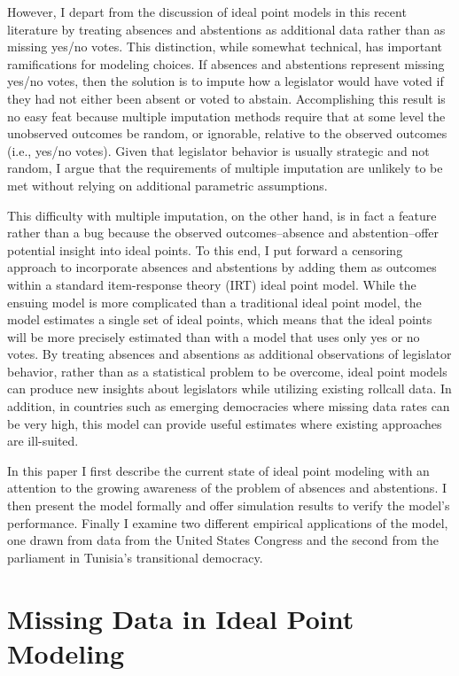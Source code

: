 	However, I depart from the discussion of ideal point models in this recent literature by treating absences and abstentions as additional data rather than as missing yes/no votes. This distinction, while somewhat technical, has important ramifications for modeling choices. If absences and abstentions represent missing yes/no votes, then the solution is to impute how a legislator would have voted if they had not either been absent or voted to abstain. Accomplishing this result is no easy feat because multiple imputation methods require that at some level the unobserved outcomes be random, or ignorable, relative to the observed outcomes (i.e., yes/no votes). Given that legislator behavior is usually strategic and not random, I argue that the requirements of multiple imputation are unlikely to be met without relying on additional parametric assumptions. 
	
	This difficulty with multiple imputation, on the other hand, is in fact a feature rather than a bug because the observed outcomes--absence and abstention--offer potential insight into ideal points. To this end, I put forward a censoring approach to incorporate absences and abstentions by adding them as outcomes within a standard item-response theory (IRT) ideal point model. While the ensuing model is more complicated than a traditional ideal point model, the model estimates a single set of ideal points, which means that the ideal points will be more precisely estimated than with a model that uses only yes or no votes. By treating absences and absentions as additional observations of legislator behavior, rather than as a statistical problem to be overcome, ideal point models can produce new insights about legislators while utilizing existing rollcall data. In addition, in countries such as emerging democracies where missing data rates can be very high, this model can provide useful estimates where existing approaches are ill-suited.
	
	In this paper I first describe the current state of ideal point modeling with an attention to the growing awareness of the problem of absences and abstentions. I then present the model formally and offer simulation results to verify the model's performance. Finally I examine two different empirical applications of the model, one drawn from data from the United States Congress and the second from the parliament in Tunisia's transitional democracy.
	
	\section{Missing Data in Ideal Point Modeling}
	
